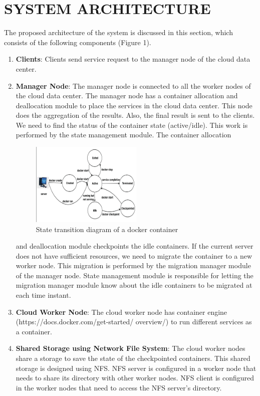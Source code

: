 \documentclass[conference]{IEEEtran}
\begin{document}
\section{ SYSTEM ARCHITECTURE}
The proposed architecture of the system is discussed in
this section, which consists of the following components
(Figure 1).
\begin{enumerate}[i]
\item \textbf{Clients}: Clients send service request to the manager
node of the cloud data center.
\item \textbf{Manager Node}: The manager node is connected to all
the worker nodes of the cloud data center. The manager
node has a container allocation and deallocation module
to place the services in the cloud data center. This node
does the aggregation of the results. Also, the final result
is sent to the clients. We need to find the status of the
container state (active/idle). This work is performed by
the state management module. The container allocation

\begin{figure}[htbp]
\centerline{\includegraphics[width=0.5\textwidth]{fig2}}
\caption{ State transition diagram of a docker container}
\label{fig}
\end{figure}
and deallocation module checkpoints the idle containers.
If the current server does not have sufficient resources,
we need to migrate the container to a new worker node.
This migration is performed by the migration manager
module of the manager node. State management module
is responsible for letting the migration manager module
know about the idle containers to be migrated at each
time instant.
\item \textbf{Cloud Worker Node}: The cloud worker node has
container engine (https://docs.docker.com/get-started/
overview/) to run different services as a container.
\item \textbf{Shared Storage using Network File System}: The cloud
worker nodes share a storage to save the state of the
checkpointed containers. This shared storage is designed
using NFS. NFS server is configured in a worker node
that needs to share its directory with other worker nodes.
NFS client is configured in the worker nodes that need
to access the NFS server’s directory.
\end{enumerate}
\end{document}
